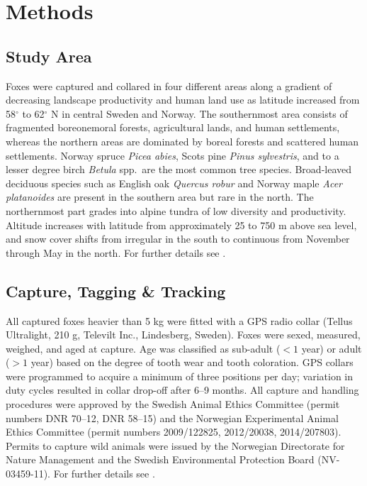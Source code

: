 \section*{Methods}

\subsection*{Study Area}
Foxes were captured and collared in four different areas along a gradient of
decreasing landscape productivity and human land use as latitude increased from
58$^{\circ}$ to 62$^{\circ}$ N in central Sweden and Norway. The southernmost
area consists of fragmented boreonemoral forests, agricultural lands, and human
settlements, whereas the northern areas are dominated by boreal forests and
scattered human settlements. Norway spruce \emph{Picea abies}, Scots pine
\emph{Pinus sylvestris}, and to a lesser degree birch \emph{Betula} spp.\ are
the most common tree species. Broad-leaved deciduous species such as English oak
\emph{Quercus robur} and Norway maple \emph{Acer platanoides} are present in
the southern area but rare in the north. The northernmost part grades into
alpine tundra of low diversity and productivity. Altitude increases with
latitude from approximately 25 to 750 m above sea level, and snow cover shifts
from irregular in the south to continuous from November through May in the
north. For further details see \citet{waltonVariationHomeRange2017}.

\subsection*{Capture, Tagging \& Tracking}
All captured foxes heavier than 5 kg were fitted with a GPS radio collar
(Tellus Ultralight, 210 g, Televilt Inc., Lindesberg, Sweden). Foxes were
sexed, measured, weighed, and aged at capture. Age was classified as sub-adult
($< 1$ year) or adult ($> 1$ year) based on the degree of tooth wear and tooth
coloration. GPS collars were programmed to acquire a minimum of three positions
per day; variation in duty cycles resulted in collar drop-off after 6--9
months. All capture and handling procedures were approved by the Swedish Animal
Ethics Committee (permit numbers DNR 70--12, DNR 58--15) and the Norwegian
Experimental Animal Ethics Committee (permit numbers 2009/122825, 2012/20038,
2014/207803). Permits to capture wild animals were issued by the Norwegian
Directorate for Nature Management and the Swedish Environmental Protection Board
(NV-03459-11). For further details see
\citet{waltonVariationHomeRange2017,waltonLongdistanceDispersalRed2018}.

